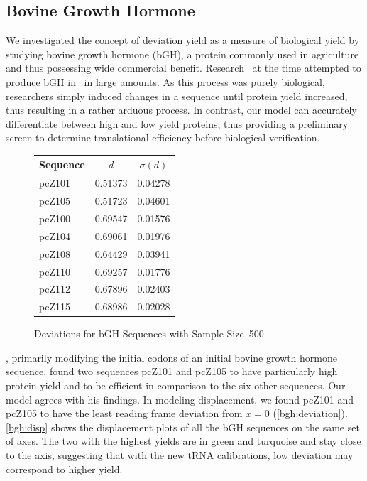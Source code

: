 \documentclass[12pt, draft]{article}
\numberwithin{equation}{section}
\begin{document}
\subsection{Bovine Growth Hormone}
\label{section:bgh}


We investigated the concept of deviation yield as a measure of biological
yield by studying bovine growth hormone (bGH), a protein commonly used
in agriculture and thus possessing wide commercial benefit.
Research~\cite{schoner:bgh} at the time attempted to produce bGH
in \ecoli\ in large amounts.  As this process was purely biological, researchers
simply induced changes in a sequence until protein yield increased, thus resulting
in a rather arduous process. In contrast, our model can accurately
differentiate between high and low yield proteins, thus providing a preliminary screen
to determine translational efficiency before biological verification.

\begin{figure}
\centering
\begin{singlespace}
    \begin{tabular}{lcc}
        \toprule
        \textbf{Sequence} & $d$ & $\sigma(d)$\\
        \midrule
        pcZ101 & 0.51373 & 0.04278 \\
        pcZ105 & 0.51723 & 0.04601 \\
        \midrule
        pcZ100 & 0.69547 & 0.01576 \\
        pcZ104 & 0.69061 & 0.01976 \\
        pcZ108 & 0.64429 & 0.03941 \\
        pcZ110 & 0.69257 & 0.01776 \\
        pcZ112 & 0.67896 & 0.02403 \\
        pcZ115 & 0.68986 & 0.02028 \\
        \bottomrule
    \end{tabular}
    \caption{Deviations for bGH Sequences with Sample Size~500}
    \label{bgh:deviation}
\end{singlespace}
\end{figure}

\citet{schoner:bgh}, primarily modifying the initial codons of an initial
bovine growth hormone sequence, found two sequences pcZ101 and pcZ105
to have particularly high protein yield and to be efficient in
comparison to
the six other sequences. Our model agrees with his findings. In modeling displacement,
we found pcZ101 and pcZ105 to have the least reading frame deviation
from $x = 0$ (\autoref{bgh:deviation}). \autoref{bgh:disp} shows the displacement
plots of all the bGH sequences on the same set of axes.  The two with the highest yields
are in green and turquoise and stay close to the axis, suggesting that with the
new tRNA calibrations, low deviation may correspond to higher yield.
\end{document}
